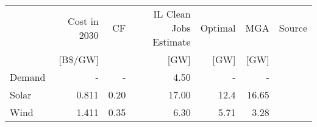 \begin{tabular}{lrrrrrr}
\toprule
       & Cost in 2030 &    CF &  IL Clean Jobs Estimate & Optimal & MGA & Source \\
      &[B\$/GW] & & [GW] & [GW] & [GW] &  \\
\midrule
Demand &                    - &     - &                     4.50 &                     - &                 - &   \cite{energy_information_administration_eia_nodate}      \\
 Solar &                 0.811 &   0.20 &                    17.00 &                  12.4 &             16.65 &    \cite{nrel_2020_2020,the_accelerate_group_clean_2019}     \\
  Wind &                 1.411 &  0.35 &                     6.30 &                  5.71 &              3.28 &   \cite{nrel_2020_2020,the_accelerate_group_clean_2019}     \\
\bottomrule
\end{tabular}
